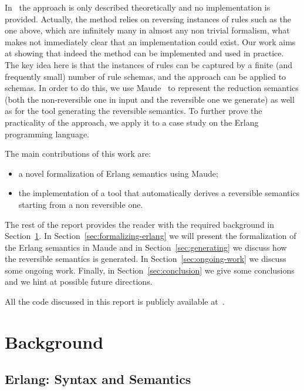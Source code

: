 \documentclass{article}[12pt,a4paper]
\theoremstyle{definition}
\begin{document}
In~\cite{LaneseM20} the approach is only described theoretically and
no implementation is provided. Actually, the method relies on
reversing instances of rules such as the one above, which are infinitely many in almost any
non trivial formalism, what makes not immediately clear that an
implementation could exist. Our work aims at showing that indeed the
method can be implemented and used in practice.  The key idea here is
that the instances of rules can be captured by a finite (and
frequently small) number of rule schemas, and the approach can be
applied to schemas. In order to do this, we use Maude~\cite{maude} to represent the reduction semantics (both the non-reversible one in input and the reversible one we generate) as well as for the tool generating the reversible semantics.
To further prove the practicality of the
approach, we apply it to a case study on the Erlang programming
language.

The main contributions of this work are:
\begin{itemize}
  \item a novel formalization of Erlang semantics using
    Maude;
  \item the implementation of a tool that automatically derives a reversible
    semantics starting from a non reversible one.
\end{itemize}

The rest of the report provides the reader with the required
background in Section~\ref{sec:background}. In
Section~\ref{sec:formalizing-erlang} we will present the formalization of
the Erlang semantics in Maude and in Section~\ref{sec:generating} we discuss how the reversible semantics
is generated. In Section~\ref{sec:ongoing-work} we discuss some
ongoing work. Finally, in Section~\ref{sec:conclusion} we give some
conclusions and we hint at possible future directions.

All the code discussed in this report is publicly available
at~\cite{erl-maude-repo}. 

\section{Background}\label{sec:background}

\subsection{Erlang: Syntax and Semantics}
\end{document}
